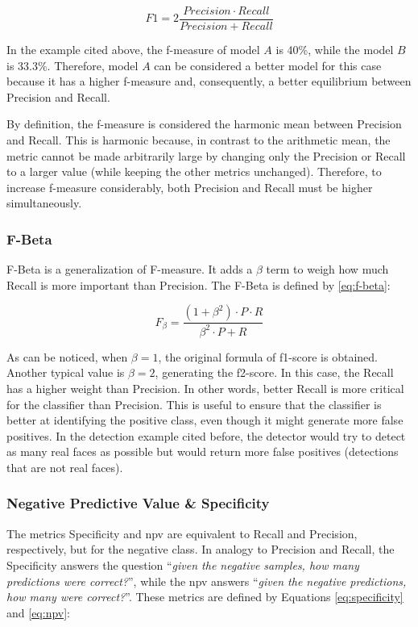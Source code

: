 \begin{equation}
\label{eq:f-measure}
F1 = 2\frac{Precision \cdot Recall}{Precision + Recall}
\end{equation}

In the example cited above, the f-measure of model $A$ is 40\%, while the model $B$ is 33.3\%. Therefore, model $A$ can be considered a better model for this case because it has a higher f-measure and, consequently, a better equilibrium between Precision and Recall.

By definition, the f-measure is considered the harmonic mean between Precision and Recall. This is harmonic because, in contrast to the arithmetic mean, the metric cannot be made arbitrarily large by changing only the Precision or Recall to a larger value (while keeping the other metrics unchanged). Therefore, to increase f-measure considerably, both Precision and Recall must be higher simultaneously.

\subsubsection{F-Beta}

F-Beta is a generalization of F-measure. It adds a $\beta$ term to weigh how much Recall is more important than Precision. The F-Beta is defined by \autoref{eq:f-beta}:

\begin{equation}
\label{eq:f-beta}
F_\beta = \frac{(1 + \beta^2) \cdot P \cdot R}{\beta^2 \cdot P + R}
\end{equation}

As can be noticed, when $\beta=1$, the original formula of f1-score is obtained. Another typical value is $\beta=2$, generating the f2-score. In this case, the Recall has a higher weight than Precision. In other words, better Recall is more critical for the classifier than Precision. This is useful to ensure that the classifier is better at identifying the positive class, even though it might generate more false positives. In the detection example cited before, the detector would try to detect as many real faces as possible but would return more false positives (detections that are not real faces).

\subsubsection{Negative Predictive Value \& Specificity}

The metrics Specificity and \acf{npv} are equivalent to Recall and Precision, respectively, but for the negative class. In analogy to Precision and Recall, the Specificity answers the question ``\textit{given the negative samples, how many predictions were correct?}'', while the \acs{npv} answers ``\textit{given the negative predictions, how many were correct?}''. These metrics are defined by Equations \ref{eq:specificity} and \ref{eq:npv}:

